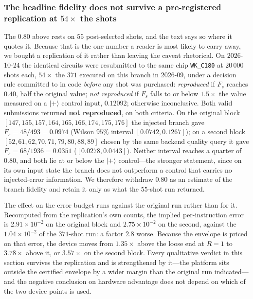 \documentclass[aps,prxquantum,reprint,superscriptaddress]{revtex4-2}
\newcommand{\ket}[1]{\lvert #1\rangle}
\begin{document}
\subsubsection*{The headline fidelity does not survive a pre-registered
replication at $54\times$ the shots}

The $0.80$ above rests on $55$ post-selected shots, and the text says so where it
quotes it. Because that is the one number a reader is most likely to carry away,
we bought a replication of it rather than leaving the caveat rhetorical. On
2026-10-24 the identical circuits were resubmitted to the same chip
\texttt{WK\_C180} at $20\,000$ shots each, $54\times$ the $371$ executed on this
branch in 2026-09, under a decision rule committed to in code \emph{before} any
shot was purchased: \emph{reproduced} if $F_s$ reaches $0.40$, half the original
value; \emph{not reproduced} if $F_s$ falls to or below $1.5\times$ the value
measured on a $\ket{+}$ control input, $0.12092$; otherwise inconclusive. Both
valid submissions returned \textbf{not reproduced}, on both criteria. On the
original block $[147,155,157,164,165,166,174,175,176]$ the injected branch gave
$F_s=48/493=0.0974$ (Wilson $95\%$ interval $[0.0742,0.1267]$); on a second block
$[52,61,62,70,71,79,80,88,89]$ chosen by the same backend quality query it gave
$F_s=68/1936=0.0351$ ($[0.0278,0.0443]$). Neither interval reaches a quarter of
$0.80$, and both lie at or below the $\ket{+}$ control---the stronger statement,
since on its own input state the branch does not outperform a control that
carries no injected-error information. We therefore withdraw $0.80$ as an
estimate of the branch fidelity and retain it only as what the $55$-shot run
returned.

The effect on the error budget runs against the original run rather than for it.
Recomputed from the replication's own counts, the implied per-instruction error is
$2.91\times10^{-2}$ on the original block and $2.75\times10^{-2}$ on the second,
against the $1.04\times10^{-2}$ of the $371$-shot run: a factor $2.8$ worse.
Because the envelope is priced on that error, the device moves from
$1.35\times$ above the loose end at $R=1$ to $3.78\times$ above it, or
$3.57\times$ on the second block. Every qualitative verdict in this section
survives the replication and is strengthened by it---the platform sits outside the
certified envelope by a wider margin than the original run indicated---and the
negative conclusion on hardware advantage does not depend on which of the two
device points is used.
\end{document}
